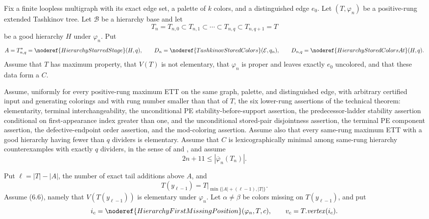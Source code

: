 \begin{lemma}
Fix a finite loopless multigraph with its exact edge set, a palette of
$k$ colors, and a distinguished edge $e_0$.  Let $(T,\varphi_n)$ be a
positive-rung extended Tashkinov tree.  Let $\mathcal B$ be a hierarchy
base and let
\[
 T_n=T_{n,0}\subset T_{n,1}\subset\cdots\subset
 T_{n,q}\subset T_{n,q+1}=T
\]
be a good hierarchy $H$ under $\varphi_n$.  Put
\[
 A=T_{n,q}^{*}=\noderef{HierarchyStarredStage}(H,q),\qquad
 D_n=\noderef{TashkinovStoredColors}(\mathcal E,q_n),
 \qquad D_{n,q}=\noderef{HierarchyStoredColorsAt}(H,q).
\]
Assume that $T$ has maximum property, that $V(T)$ is not elementary,
that $\varphi_n$ is proper and leaves exactly $e_0$ uncolored, and that
these data form a  $C$.

Assume, uniformly for every positive-rung maximum ETT on the same graph,
palette, and distinguished edge, with arbitrary certified input and
generating colorings and with rung number smaller than that of $T$, the
six lower-rung assertions of the technical theorem: elementarity,
terminal interchangeability, the unconditional PE stability-before-support
assertion, the predecessor-ladder stability assertion conditional on
first-appearance index greater than one, and the unconditional stored-pair
disjointness assertion, the terminal PE component assertion, the defective-endpoint
order assertion, and the mod-coloring assertion.  Assume also that every
same-rung maximum ETT with a good hierarchy having fewer than $q$
dividers is elementary.  Assume that $C$ is lexicographically minimal
among same-rung hierarchy counterexamples with exactly $q$ dividers, in
the sense of  and
, and assume
\[
                 2n+11\leq |\overline\varphi_n(T_n)|.          \tag{L}
\]

Put $\ell=|T|-|A|$, the number of exact tail additions above $A$, and
\[
 T(y_{\ell-1})=T\big|_{\min\{|A|+(\ell-1),|T|\}}.
\]
Assume (6.6), namely that $V(T(y_{\ell-1}))$ is elementary under
$\varphi_n$.  Let $\alpha\ne\beta$ be colors missing on
$T(y_{\ell-1})$, and put
\[
 i_c=\noderef{HierarchyFirstMissingPosition}(\varphi_n,T,c),
 \qquad v_c=T.\mathit{vertex}(i_c).
\]


\end{lemma}
